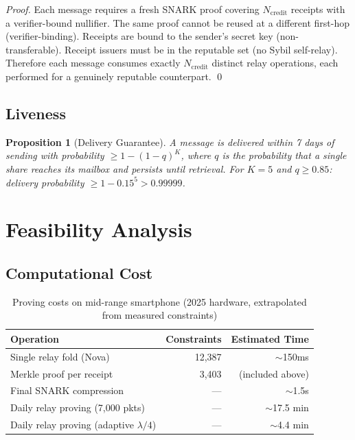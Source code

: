 \documentclass[11pt,a4paper]{article}
\newtheorem{proposition}[theorem]{Proposition}
\begin{document}
\begin{proof}
Each message requires a fresh SNARK proof covering $N_{\text{credit}}$ receipts with a verifier-bound nullifier. The same proof cannot be reused at a different first-hop (verifier-binding). Receipts are bound to the sender's secret key (non-transferable). Receipt issuers must be in the reputable set (no Sybil self-relay). Therefore each message consumes exactly $N_{\text{credit}}$ distinct relay operations, each performed for a genuinely reputable counterpart. \qed
\end{proof}

\subsection{Liveness}

\begin{proposition}[Delivery Guarantee]
A message is delivered within 7 days of sending with probability $\geq 1 - (1-q)^K$, where $q$ is the probability that a single share reaches its mailbox and persists until retrieval. For $K=5$ and $q \geq 0.85$: delivery probability $\geq 1 - 0.15^5 > 0.99999$.
\end{proposition}


\section{Feasibility Analysis}
\label{sec:feasibility}

\subsection{Computational Cost}

\begin{table}[h]
\centering
\caption{Proving costs on mid-range smartphone (2025 hardware, extrapolated from measured constraints)}
\begin{tabular}{@{}lrr@{}}
\toprule
Operation & Constraints & Estimated Time \\
\midrule
Single relay fold (Nova) & 12,387 & $\sim$150ms \\
Merkle proof per receipt & 3,403 & (included above) \\
Final SNARK compression & --- & $\sim$1.5s \\
Daily relay proving (7,000 pkts) & --- & $\sim$17.5 min \\
Daily relay proving (adaptive $\lambda/4$) & --- & $\sim$4.4 min \\
\bottomrule
\end{tabular}
\label{tab:costs}
\end{table}
\end{document}
